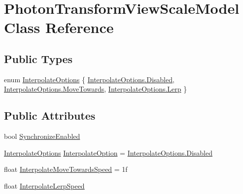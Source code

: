 \hypertarget{class_photon_transform_view_scale_model}{}\section{Photon\+Transform\+View\+Scale\+Model Class Reference}
\label{class_photon_transform_view_scale_model}
\subsection*{Public Types}
\begin{DoxyCompactItemize}
\item 
enum \hyperlink{class_photon_transform_view_scale_model_a08ebb1a595144712993238495531432e}{Interpolate\+Options} \{ \hyperlink{class_photon_transform_view_scale_model_a08ebb1a595144712993238495531432eab9f5c797ebbf55adccdd8539a65a0241}{Interpolate\+Options.\+Disabled}, 
\hyperlink{class_photon_transform_view_scale_model_a08ebb1a595144712993238495531432ea62e88848d85e21d979ff5e5efda8a268}{Interpolate\+Options.\+Move\+Towards}, 
\hyperlink{class_photon_transform_view_scale_model_a08ebb1a595144712993238495531432ea412cb411cecf9196f717d6bc9c272c62}{Interpolate\+Options.\+Lerp}
 \}
\end{DoxyCompactItemize}
\subsection*{Public Attributes}
\begin{DoxyCompactItemize}
\item 
bool \hyperlink{class_photon_transform_view_scale_model_a22b3360da0a4aa09e0086af1ae091da2}{Synchronize\+Enabled}
\item 
\hyperlink{class_photon_transform_view_scale_model_a08ebb1a595144712993238495531432e}{Interpolate\+Options} \hyperlink{class_photon_transform_view_scale_model_a9680982f5a84536b57ae3f806291ab37}{Interpolate\+Option} = \hyperlink{class_photon_transform_view_scale_model_a08ebb1a595144712993238495531432eab9f5c797ebbf55adccdd8539a65a0241}{Interpolate\+Options.\+Disabled}
\item 
float \hyperlink{class_photon_transform_view_scale_model_ac326b99330c3bcfe8df598893a2f3261}{Interpolate\+Move\+Towards\+Speed} = 1f
\item 
float \hyperlink{class_photon_transform_view_scale_model_a7fd5e6b606026fb096e79391b587a66b}{Interpolate\+Lerp\+Speed}
\end{DoxyCompactItemize}


